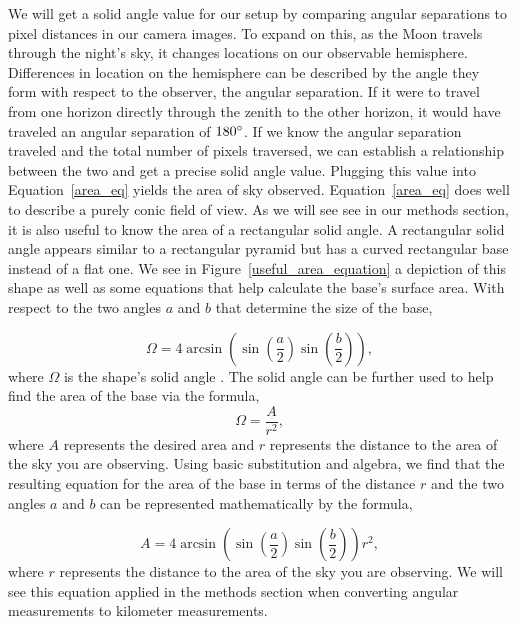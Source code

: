 We will get a solid angle value for our setup by comparing angular separations to pixel distances in our camera images.
To expand on this, as the Moon travels through the night's sky, it changes locations on our observable hemisphere.
Differences in location on the hemisphere can be described by the angle they form with respect to the observer, the angular separation.
If it were to travel from one horizon directly through the zenith to the other horizon, it would have traveled an angular separation of $180 \degree$.  
If we know the angular separation traveled and the total number of pixels traversed, we can establish a relationship between the two and get a precise solid angle value.
Plugging this value into Equation~\ref{area_eq} yields the area of sky observed.
Equation~\ref{area_eq} does well to describe a purely conic field of view.
As we will see see in our methods section, it is also useful to know the area of a rectangular solid angle.
A rectangular solid angle appears similar to a rectangular pyramid but has a curved rectangular base instead of a flat one.
We see in Figure~\ref{useful_area_equation} a depiction of this shape as well as some equations that help calculate the base's surface area.
With respect to the two angles $a$ and $b$ that determine the size of the base,

\begin{equation}
\Omega =  4 \arcsin{(\sin{(\frac{a}{2})}\sin{(\frac{b}{2})})},
\label{steradian1}
\end{equation}
where $\Omega$ is the shape's solid angle \cite{wiki:Solid_angle}.  
The solid angle can be further used to help find the area of the base via the formula,
\begin{equation}
\Omega = \frac{A}{r^2},
\label{steradian2}
\end{equation}
where $A$ represents the desired area and $r$ represents the distance to the area of the sky you are observing.
Using basic substitution and algebra, we find that the resulting equation for the area of the base in terms of the distance $r$ and the two angles $a$ and $b$ can be represented mathematically by the formula,

\begin{equation}
A =  4 \arcsin{(\sin{(\frac{a}{2})}\sin{(\frac{b}{2})})} r^2,
\label{small_area_eq}
\end{equation}
where $r$ represents the distance to the area of the sky you are observing.
We will see this equation applied in the methods section when converting angular measurements to kilometer measurements.

